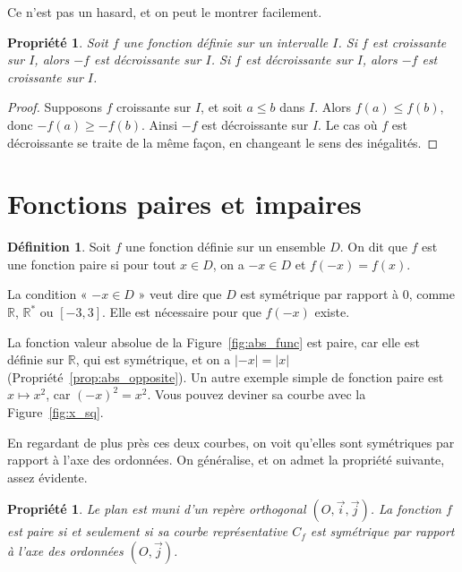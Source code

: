 \documentclass[12pt,a4paper]{article}
\theoremstyle{plain}
\newtheorem{property}[theorem]{Propriété}
\theoremstyle{definition}
\newtheorem{definition}[theorem]{Définition}
\theoremstyle{remark}
\begin{document}
Ce n'est pas un hasard, et on peut le montrer facilement.

\begin{tcolorbox}[graybar]
  \begin{property}
    \label{prop:moins_f}
    Soit $f$ une fonction définie sur un intervalle $I$. Si $f$ est croissante sur
    $I$, alors $-f$ est décroissante sur $I$. Si $f$ est décroissante sur $I$, alors
    $-f$ est croissante sur $I$.
  \end{property}
\end{tcolorbox}

\begin{proof}
  Supposons $f$ croissante sur $I$, et soit $a \le b$ dans $I$. Alors
  $f(a) \le f(b)$, donc $-f(a) \ge -f(b)$. Ainsi $-f$ est décroissante sur $I$.
  Le cas où $f$ est décroissante se traite de la même façon, en changeant le sens
  des inégalités.
\end{proof}

\section{Fonctions paires et impaires}

\begin{tcolorbox}[navybar]
  \begin{definition}
    Soit $f$ une fonction définie sur un ensemble $D$. On dit que $f$ est une
    fonction paire si pour tout $x \in D$, on a $-x \in D$ et $f(-x) = f(x)$.
  \end{definition}
\end{tcolorbox}

La condition « $-x \in D$ » veut dire que $D$ est symétrique par rapport à $0$,
comme $\mathbb{R}$, $\mathbb{R}^*$ ou $[-3, 3]$. Elle est nécessaire pour que
$f(-x)$ existe.

La fonction valeur absolue de la Figure~\ref{fig:abs_func} est paire, car elle est
définie sur $\mathbb{R}$, qui est symétrique, et on a $\lvert -x \rvert = \lvert x
\rvert$ (Propriété~\ref{prop:abs_opposite}). Un autre exemple simple de fonction
paire est $x \mapsto x^2$, car $(-x)^2 = x^2$. Vous pouvez deviner sa courbe avec la
Figure~\ref{fig:x_sq}.

En regardant de plus près ces deux courbes, on voit qu'elles sont symétriques par
rapport à l'axe des ordonnées. On généralise, et on admet la propriété suivante,
assez évidente.

\begin{tcolorbox}[graybar]
  \begin{property}
    Le plan est muni d'un repère orthogonal $(O, \vec{i}, \vec{j})$. La fonction $f$
    est paire si et seulement si sa courbe représentative $C_f$ est symétrique par
    rapport à l'axe des ordonnées $(O, \vec{j})$.
  \end{property}
\end{tcolorbox}
\end{document}
